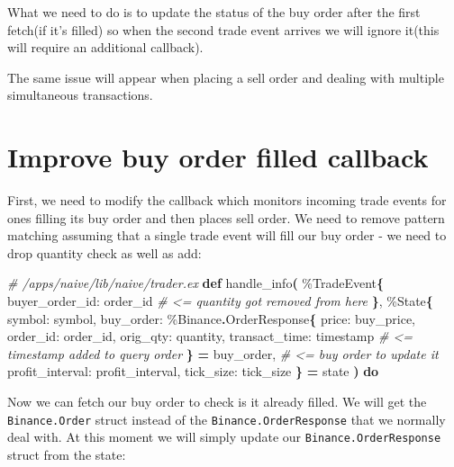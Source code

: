 \documentclass[
  oneside]{book}
\newenvironment{Shaded}{\begin{snugshade}}{\end{snugshade}}
\newcommand{\CommentTok}[1]{\textcolor[rgb]{0.56,0.35,0.01}{\textit{#1}}}
\newcommand{\ConstantTok}[1]{\textcolor[rgb]{0.56,0.35,0.01}{#1}}
\newcommand{\FunctionTok}[1]{\textcolor[rgb]{0.13,0.29,0.53}{\textbf{#1}}}
\newcommand{\KeywordTok}[1]{\textcolor[rgb]{0.13,0.29,0.53}{\textbf{#1}}}
\newcommand{\NormalTok}[1]{#1}
\newcommand{\OperatorTok}[1]{\textcolor[rgb]{0.81,0.36,0.00}{\textbf{#1}}}
\newcommand{\VariableTok}[1]{\textcolor[rgb]{0.00,0.00,0.00}{#1}}
\begin{document}
What we need to do is to update the status of the buy order after the first fetch(if it's filled) so when the second trade event arrives we will ignore it(this will require an additional callback).

The same issue will appear when placing a sell order and dealing with multiple simultaneous transactions.

\section{Improve buy order filled callback}\label{improve-buy-order-filled-callback}

First, we need to modify the callback which monitors incoming trade events for ones filling its buy order and then places sell order. We need to remove pattern matching assuming that a single trade event will fill our buy order - we need to drop quantity check as well as add:

\begin{Shaded}
\begin{Highlighting}[]
  \CommentTok{\# /apps/naive/lib/naive/trader.ex}
  \KeywordTok{def}\NormalTok{ handle\_info}\FunctionTok{(}
\NormalTok{        \%}\ConstantTok{TradeEvent}\FunctionTok{\{}
          \VariableTok{buyer\_order\_id:}\NormalTok{ order\_id }\CommentTok{\# \textless{}= quantity got removed from here}
        \FunctionTok{\}}\NormalTok{,}
\NormalTok{        \%}\ConstantTok{State}\FunctionTok{\{}
          \VariableTok{symbol:}\NormalTok{ symbol,}
          \VariableTok{buy\_order:}
\NormalTok{            \%}\ConstantTok{Binance}\OperatorTok{.}\ConstantTok{OrderResponse}\FunctionTok{\{}
              \VariableTok{price:}\NormalTok{ buy\_price,}
              \VariableTok{order\_id:}\NormalTok{ order\_id,}
              \VariableTok{orig\_qty:}\NormalTok{ quantity,}
              \VariableTok{transact\_time:}\NormalTok{ timestamp }\CommentTok{\# \textless{}= timestamp added to query order}
            \FunctionTok{\}} \OperatorTok{=}\NormalTok{ buy\_order, }\CommentTok{\# \textless{}= buy order to update it}
          \VariableTok{profit\_interval:}\NormalTok{ profit\_interval,}
          \VariableTok{tick\_size:}\NormalTok{ tick\_size}
        \FunctionTok{\}} \OperatorTok{=}\NormalTok{ state}
      \FunctionTok{)} \KeywordTok{do}
\end{Highlighting}
\end{Shaded}

\newpage

Now we can fetch our buy order to check is it already filled. We will get the \texttt{Binance.Order} struct instead of the \texttt{Binance.OrderResponse} that we normally deal with. At this moment we will simply update our \texttt{Binance.OrderResponse} struct from the state:
\end{document}

